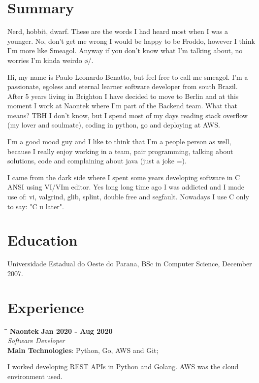 \documentclass[margin]{res}
\begin{document}
  

\address{Essen, DE \\ benatto@gmail.com \\ Phone: +49 017677556352 \\ Post Code: 45130 }
                           
                        
\begin{resume}
 
\section{Summary}

Nerd, hobbit, dwarf. These are the words I had heard most when I was a younger. No, don't get me wrong I would be happy to be Froddo,
however I think I'm more like Smeagol. Anyway if you don't know what I'm talking about, no worries I'm kinda weirdo \o/.

Hi, my name is Paulo Leonardo Benatto, but feel free to call me smeagol. I'm a passionate, egoless and eternal learner software developer
from south Brazil. After 5 years living in Brighton I have decided to move to Berlin and at this moment I work at Naontek where I'm part
of the Backend team. What that means? TBH I don't know, but I spend most of my days reading stack overflow (my lover and soulmate), coding
in python, go and deploying at AWS.

I'm a good mood guy and I like to think that I'm a people person as well, because I really enjoy working in a team, pair programming,
talking about solutions, code and complaining about java (just a joke =).

I came from the dark side where I spent some years developing software in C ANSI using VI/VIm editor. Yes long long time ago I was
addicted and I made use of: vi, valgrind, glib, splint, double free and segfault. Nowadays I use C only to say: "C u later".
 
\section{Education}	Universidade Estadual do Oeste do Parana, BSc in Computer Science, December 2007.

\section{Experience}


\vspace{-0.1in}
   \begin{tabbing}
   \hspace{2.3in}\= \hspace{1.7in}\= \kill
    \textbf{Naontek}    \>\>\textbf{Jan 2020 - Aug 2020}\\
    \textit{Software Developer}\\        
    \textbf{Main Technologies}: Python, Go, AWS and Git;
   \end{tabbing}\vspace{-20pt}
    \vspace{2mm}
I worked developing REST APIs in Python and Golang. AWS was the cloud environment used.


\end{resume}
\end{document}
